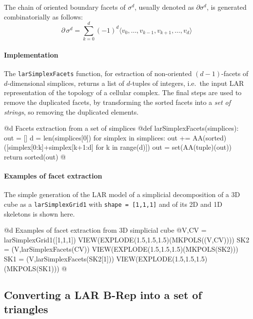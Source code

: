 \documentclass[11pt,oneside]{article}	%
\begin{document}
The chain of oriented boundary facets of $\sigma^d$, usually denoted as $\partial \sigma^d$, is generated combinatorially as follows:
\[
\partial\, \sigma^d = \sum_{k=0}^d (-1)^d \langle v_0, \ldots, v_{k-1}, v_{k+1}, \ldots, v_d \rangle
\]

\paragraph{Implementation}

The \texttt{larSimplexFacets} function, for estraction of non-oriented $(d-1)$-facets of $d$-dimensional simplices, returns a list of $d$-tuples of integers, i.e.~the input LAR representation of the topology of a cellular complex. The final steps are used to remove the duplicated facets, by transforming the sorted facets into a \emph{set of strings}, so removing the duplicated elements.
        
@d Facets extraction from a set of simplices
@{def larSimplexFacets(simplices):
    out = []
    d = len(simplices[0])
    for simplex in simplices:
        out += AA(sorted)([simplex[0:k]+simplex[k+1:d] for k in range(d)])
    out = set(AA(tuple)(out))
    return  sorted(out)
@}

\paragraph{Examples of facet extraction}
The simple generation of the LAR model of a simplicial decomposition of a 3D cube as a \texttt{larSimplexGrid1} with \texttt{shape = [1,1,1]} and of its 2D and 1D skeletons is shown here.

@d Examples of facet extraction from 3D simplicial cube
@{V,CV = larSimplexGrid1([1,1,1])
VIEW(EXPLODE(1.5,1.5,1.5)(MKPOLS((V,CV))))
SK2 = (V,larSimplexFacets(CV))
VIEW(EXPLODE(1.5,1.5,1.5)(MKPOLS(SK2)))
SK1 = (V,larSimplexFacets(SK2[1]))
VIEW(EXPLODE(1.5,1.5,1.5)(MKPOLS(SK1)))
@}



\subsection{Converting a LAR B-Rep into a set of triangles}
\end{document}
